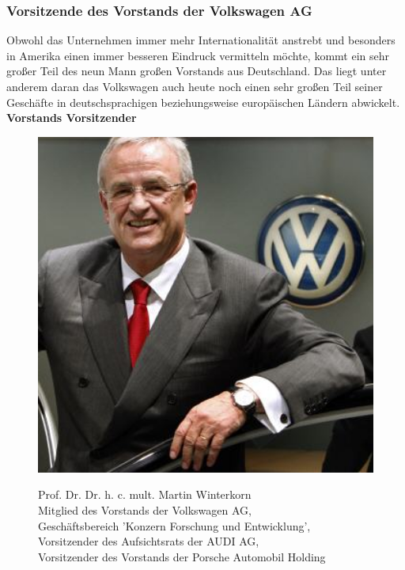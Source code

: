 \documentclass[12pt]{article}
\begin{document}
\subsubsection{Vorsitzende des Vorstands der Volkswagen AG}
Obwohl das Unternehmen immer mehr Internationalität anstrebt und besonders in Amerika einen immer besseren Eindruck vermitteln möchte, kommt ein sehr großer Teil des neun Mann großen Vorstands aus Deutschland. Das liegt unter anderem daran das Volkswagen auch heute noch einen sehr großen Teil seiner Geschäfte in deutschsprachigen beziehungsweise europäischen Ländern abwickelt.
\textbf{Vorstands Vorsitzender}
\begin{figure}[here!]
	\centering
	\begin{minipage}[h]{0.20\textwidth}
		\centering
		\includegraphics[width=1.0\textwidth]{images/MartinWinterkorn.jpg}
		\label{fig:vorstandvw0}
		\cite{mwpic}
	\end{minipage}
		\begin{minipage}[h]{0.10\textwidth}
		\hspace{1cm} 
	\end{minipage}
	\begin{minipage}[h]{0.65\textwidth}
		Prof. Dr. Dr. h. c. mult. Martin Winterkorn\\
		Mitglied des Vorstands der Volkswagen AG,\\
		Geschäftsbereich 'Konzern Forschung und Entwicklung',\\
		Vorsitzender des Aufsichtsrats der AUDI AG,\\
		Vorsitzender des Vorstands der Porsche Automobil Holding 
	\end{minipage}
\end{figure}\FloatBarrier\noindent
\end{document}
